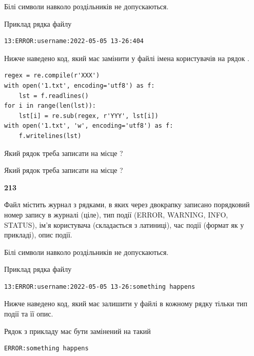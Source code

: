 Білі символи навколо роздільників не допускаються.

Приклад рядка файлу



\begin{verbatim}
13:ERROR:username:2022-05-05 13-26:404
\end{verbatim}


Нижче наведено код, який має замінити у файлі імена користувачів на рядок .



\begin{verbatim}
regex = re.compile(r'XXX')
with open('1.txt', encoding='utf8') as f:
    lst = f.readlines()
for i in range(len(lst)):
    lst[i] = re.sub(regex, r'YYY', lst[i])
with open('1.txt', 'w', encoding='utf8') as f:
    f.writelines(lst)
\end{verbatim}







Який рядок треба записати на місце  ?\par
\vspace{5mm}


Який рядок треба записати на місце  ?\par


\newpage

{\begin {center}\textbf{ 213}\end {center}}\par
Файл  містить журнал з рядками, в яких через двокрапку записано поряд\-ко\-вий номер запису в журналі (ціле), тип події (ERROR, WARNING, INFO, STATUS), ім'я користувача (складається з латиниці), час події (фор\-мат як у прикладі), опис події.

Білі символи навколо роздільників не допускаються.

Приклад рядка файлу



\begin{verbatim}
13:ERROR:username:2022-05-05 13-26:something happens
\end{verbatim}


Нижче наведено код, який має залишити у файлі в кожному рядку тільки тип події та її опис.

Рядок з прикладу має бути замінений на такий



\begin{verbatim}
ERROR:something happens
\end{verbatim}





